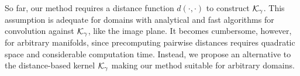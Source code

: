 So far, our method requires a distance function $d(\cdot,\cdot)$ to construct $\mathcal K_\gamma$.  This assumption is adequate for domains with analytical and fast algorithms for convolution against $\mathcal K_\gamma$, like the image plane.  It becomes cumbersome, however, for arbitrary manifolds, since precomputing pairwise distances requires quadratic space and considerable computation time. %
Instead, we propose an alternative to the distance-based kernel $\mathcal K_{\gamma}$ making our method suitable for arbitrary domains.

